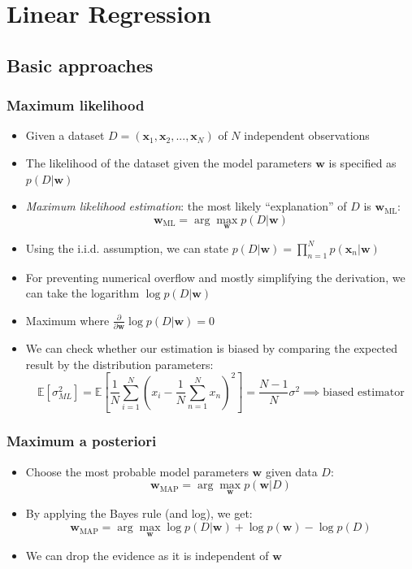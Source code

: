 \section{Linear Regression}

\subsection{Basic approaches}
\subsubsection{Maximum likelihood}
\begin{itemize}
	\item Given a dataset $D=(\bm{x}_1, \bm{x}_2, ..., \bm{x}_N)$ of $N$ independent observations
	\item The likelihood of the dataset given the model parameters $\bm{w}$ is specified as $p(D|\bm{w})$
	\item \textit{Maximum likelihood estimation}: the most likely ``explanation'' of $D$ is $\bm{w}_{\text{ML}}$:
	$$\bm{w}_{\text{ML}} = \arg\max_{\bm{w}} p(D|\bm{w})$$
	\item Using the i.i.d. assumption, we can state $p(D|\bm{w}) = \prod\limits_{n=1}^{N} p(\bm{x}_n|\bm{w})$
	\item For preventing numerical overflow and mostly simplifying the derivation, we can take the logarithm $\log p(D|\bm{w})$
	\item Maximum where $\frac{\partial}{\partial \bm{w}}\log p(D|\bm{w}) = 0$
	\item We can check whether our estimation is biased by comparing the expected result by the distribution parameters: $$\mathbb{E}\left[\sigma_{ML}^{2}\right] = \mathbb{E}\left[\frac{1}{N}\sum\limits_{i=1}^{N}\left(x_i - \frac{1}{N}\sum_{n=1}^{N} x_n\right)^2\right] = \frac{N-1}{N} \sigma^2 \implies \text{biased estimator}$$
\end{itemize}
\subsubsection{Maximum a posteriori}
\begin{itemize}
	\item Choose the most probable model parameters $\bm{w}$ given data $D$:
	$$\bm{w}_{\text{MAP}} = \arg\max_{\bm{w}} p(\bm{w}|D)$$
	\item By applying the Bayes rule (and log), we get:
	$$\bm{w}_{\text{MAP}} = \arg\max_{\bm{w}} \log p(D|\bm{w}) + \log p(\bm{w}) - \log p(D)$$
	\item We can drop the evidence as it is independent of $\bm{w}$
\end{itemize}
